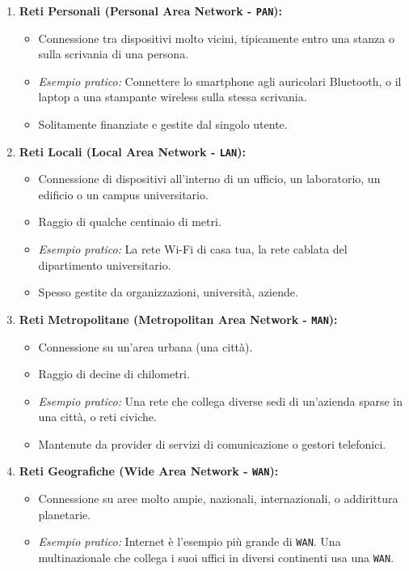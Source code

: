 \begin{enumerate}
    \item \textbf{Reti Personali (Personal Area Network - \texttt{PAN}):}
    \begin{itemize}
        \item Connessione tra dispositivi molto vicini, tipicamente entro una stanza o sulla scrivania di una persona.
        \item \textit{Esempio pratico:} Connettere lo smartphone agli auricolari Bluetooth, o il laptop a una stampante wireless sulla stessa scrivania.
        \item Solitamente finanziate e gestite dal singolo utente.
    \end{itemize}
    \item \textbf{Reti Locali (Local Area Network - \texttt{LAN}):}
    \begin{itemize}
        \item Connessione di dispositivi all'interno di un ufficio, un laboratorio, un edificio o un campus universitario.
        \item Raggio di qualche centinaio di metri.
        \item \textit{Esempio pratico:} La rete Wi-Fi di casa tua, la rete cablata del dipartimento universitario.
        \item Spesso gestite da organizzazioni, università, aziende.
    \end{itemize}
    \item \textbf{Reti Metropolitane (Metropolitan Area Network - \texttt{MAN}):}
    \begin{itemize}
        \item Connessione su un'area urbana (una città).
        \item Raggio di decine di chilometri.
        \item \textit{Esempio pratico:} Una rete che collega diverse sedi di un'azienda sparse in una città, o reti civiche.
        \item Mantenute da provider di servizi di comunicazione o gestori telefonici.
    \end{itemize}
    \item \textbf{Reti Geografiche (Wide Area Network - \texttt{WAN}):}
    \begin{itemize}
        \item Connessione su aree molto ampie, nazionali, internazionali, o addirittura planetarie.
        \item \textit{Esempio pratico:} Internet è l'esempio più grande di \texttt{WAN}. Una multinazionale che collega i suoi uffici in diversi continenti usa una \texttt{WAN}.

\end{itemize}
\end{enumerate}
